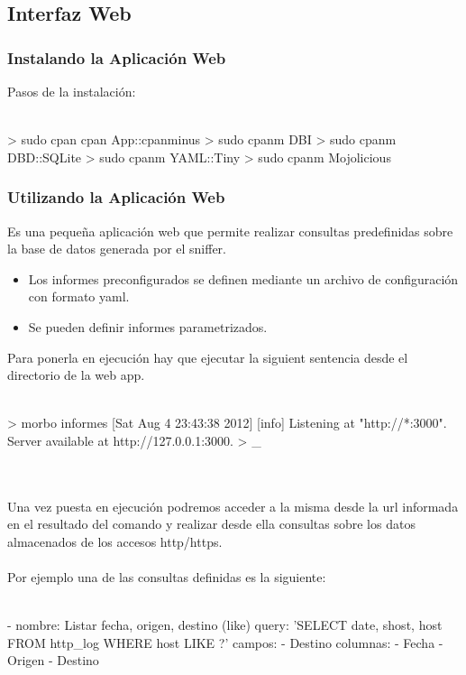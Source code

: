 \subsection{Interfaz Web}

\subsubsection{Instalando la Aplicación Web}

Pasos de la instalación:
\\\\
{\small
\begin{boxedverbatim}
	> sudo cpan cpan App::cpanminus
	> sudo cpanm DBI
	> sudo cpanm DBD::SQLite
	> sudo cpanm YAML::Tiny
	> sudo cpanm Mojolicious
\end{boxedverbatim}
}

\subsubsection{Utilizando la Aplicación Web}

Es una pequeña aplicación web que permite realizar consultas predefinidas sobre la base de datos generada por el sniffer. 
\begin{itemize}
	\item Los informes preconfigurados se definen mediante un archivo de configuración con formato yaml.
	\item Se pueden definir informes parametrizados.
\end{itemize}

Para ponerla en ejecución hay que ejecutar la siguient sentencia desde el directorio de la web app.
\\\\
{\small
\begin{boxedverbatim}
	> morbo informes
	[Sat Aug  4 23:43:38 2012] [info] Listening at "http://*:3000".
	Server available at http://127.0.0.1:3000.
	> _
\end{boxedverbatim}
}
\\\\
Una vez puesta en ejecución podremos acceder a la misma desde la url informada 
en el resultado del comando y realizar desde ella consultas sobre los datos 
almacenados de los accesos http/https.
\\
\\Por ejemplo una de las consultas definidas es la siguiente: 
\\\\
	{\small
	\begin{boxedverbatim}
	- nombre: Listar fecha, origen, destino (like)
  query: 'SELECT date, shost, host FROM http_log WHERE host LIKE ?'
  campos: 
   - Destino
  columnas:
   - Fecha
   - Origen
   - Destino
	\end{boxedverbatim}
	}
